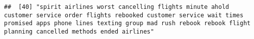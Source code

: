 \documentclass[
]{article}
\begin{document}
\begin{verbatim}
##  [40] "spirit airlines worst cancelling flights minute ahold customer service order flights rebooked customer service wait times promised apps phone lines texting group mad rush rebook rebook flight planning cancelled methods ended airlines"                                                                                                                                                                                                                                                                                                                                                                                                                                                                                                                                                                                                                                                                                                                                                                                                                                                                                                                                                                                                                                                                                                                                                                                                                                                                                                                                                                                                                                                                                                                                                     

\end{verbatim}
\end{document}
